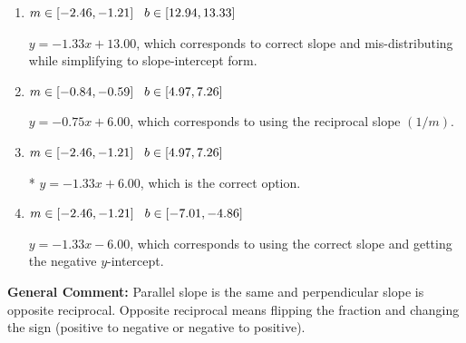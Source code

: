 \documentclass{extbook}[14pt]
\begin{document}
\begin{enumerate}
{\begin{enumerate}[label=\Alph*.]
 $y = 1.33x + 14.00$, which corresponds to using the negative slope.
\item \( m \in [-2.46, -1.21] \hspace*{3mm} b \in [12.94, 13.33] \)

 $y = -1.33x + 13.00$, which corresponds to correct slope and mis-distributing while simplifying to slope-intercept form.
\item \( m \in [-0.84, -0.59] \hspace*{3mm} b \in [4.97, 7.26] \)

 $y = -0.75x + 6.00$, which corresponds to using the reciprocal slope $(1/m)$.
\item \( m \in [-2.46, -1.21] \hspace*{3mm} b \in [4.97, 7.26] \)

* $y = -1.33x + 6.00$, which is the correct option.
\item \( m \in [-2.46, -1.21] \hspace*{3mm} b \in [-7.01, -4.86] \)

 $y = -1.33x - 6.00$, which corresponds to using the correct slope and getting the negative $y$-intercept.
\end{enumerate}

\textbf{General Comment:} Parallel slope is the same and perpendicular slope is opposite reciprocal. Opposite reciprocal means flipping the fraction and changing the sign (positive to negative or negative to positive).
}
\end{enumerate}
\end{document}
